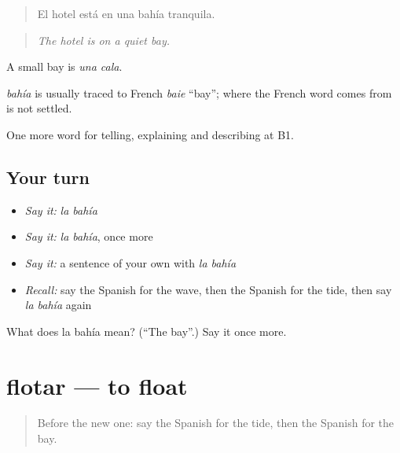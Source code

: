 \begin{quote}
El hotel está en una bahía tranquila.
\end{quote}

\begin{quote}
\emph{The hotel is on a quiet bay.}
\end{quote}

A small bay is \emph{una cala}.

\begin{cousinweb}
\emph{bahía} is usually traced to French \emph{baie} \textquotedblleft{}bay\textquotedblright{}; where the French word comes from is not settled.
\end{cousinweb}

\begin{grammarlens}[title={What you've built}]
One more word for telling, explaining and describing at B1.
\end{grammarlens}

\subsection*{Your turn}
\begin{itemize}
\raggedright
  \item \emph{Say it:} \emph{la bahía}
  \item \emph{Say it:} \emph{la bahía}, once more
  \item \emph{Say it:} a sentence of your own with \emph{la bahía}
  \item \emph{Recall:} say the Spanish for the wave, then the Spanish for the tide, then say \emph{la bahía} again
\end{itemize}

\begin{tcolorbox}[breakable,colback=teal!4,colframe=teal!35!black,title={Before you move on}]
What does la bahía mean? (\textquotedblleft{}The bay\textquotedblright{}.) Say it once more.
\end{tcolorbox}
\section[flotar]{flotar — to float}

\label{lesson:ES-C688-flotar}



\begin{quote}
Before the new one: say the Spanish for the tide, then the Spanish for the bay.
\end{quote}

